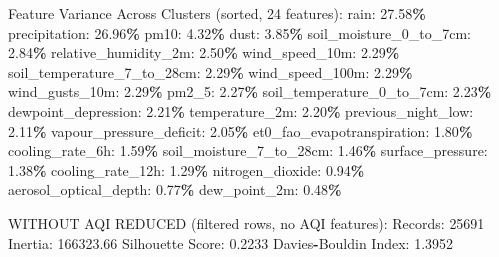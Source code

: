 \documentclass[
  letterpaper,
  DIV=11,
  numbers=noendperiod]{scrartcl}
\newenvironment{Shaded}{\begin{snugshade}}{\end{snugshade}}
\newcommand{\BuiltInTok}[1]{#1}
\newcommand{\DecValTok}[1]{\textcolor[rgb]{0.00,0.00,0.81}{#1}}
\newcommand{\FloatTok}[1]{\textcolor[rgb]{0.00,0.00,0.81}{#1}}
\newcommand{\NormalTok}[1]{#1}
\newcommand{\OperatorTok}[1]{\textcolor[rgb]{0.81,0.36,0.00}{\textbf{#1}}}
\begin{document}
\begin{Shaded}
\begin{Highlighting}[]
\NormalTok{  Feature Variance Across Clusters (}\BuiltInTok{sorted}\NormalTok{, }\DecValTok{24}\NormalTok{ features):}
\NormalTok{    rain: }\FloatTok{27.58}\OperatorTok{\%}
\NormalTok{    precipitation: }\FloatTok{26.96}\OperatorTok{\%}
\NormalTok{    pm10: }\FloatTok{4.32}\OperatorTok{\%}
\NormalTok{    dust: }\FloatTok{3.85}\OperatorTok{\%}
\NormalTok{    soil\_moisture\_0\_to\_7cm: }\FloatTok{2.84}\OperatorTok{\%}
\NormalTok{    relative\_humidity\_2m: }\FloatTok{2.50}\OperatorTok{\%}
\NormalTok{    wind\_speed\_10m: }\FloatTok{2.29}\OperatorTok{\%}
\NormalTok{    soil\_temperature\_7\_to\_28cm: }\FloatTok{2.29}\OperatorTok{\%}
\NormalTok{    wind\_speed\_100m: }\FloatTok{2.29}\OperatorTok{\%}
\NormalTok{    wind\_gusts\_10m: }\FloatTok{2.29}\OperatorTok{\%}
\NormalTok{    pm2\_5: }\FloatTok{2.27}\OperatorTok{\%}
\NormalTok{    soil\_temperature\_0\_to\_7cm: }\FloatTok{2.23}\OperatorTok{\%}
\NormalTok{    dewpoint\_depression: }\FloatTok{2.21}\OperatorTok{\%}
\NormalTok{    temperature\_2m: }\FloatTok{2.20}\OperatorTok{\%}
\NormalTok{    previous\_night\_low: }\FloatTok{2.11}\OperatorTok{\%}
\NormalTok{    vapour\_pressure\_deficit: }\FloatTok{2.05}\OperatorTok{\%}
\NormalTok{    et0\_fao\_evapotranspiration: }\FloatTok{1.80}\OperatorTok{\%}
\NormalTok{    cooling\_rate\_6h: }\FloatTok{1.59}\OperatorTok{\%}
\NormalTok{    soil\_moisture\_7\_to\_28cm: }\FloatTok{1.46}\OperatorTok{\%}
\NormalTok{    surface\_pressure: }\FloatTok{1.38}\OperatorTok{\%}
\NormalTok{    cooling\_rate\_12h: }\FloatTok{1.29}\OperatorTok{\%}
\NormalTok{    nitrogen\_dioxide: }\FloatTok{0.94}\OperatorTok{\%}
\NormalTok{    aerosol\_optical\_depth: }\FloatTok{0.77}\OperatorTok{\%}
\NormalTok{    dew\_point\_2m: }\FloatTok{0.48}\OperatorTok{\%}

\NormalTok{WITHOUT AQI REDUCED (filtered rows, no AQI features):}
\NormalTok{  Records: }\DecValTok{25691}
\NormalTok{  Inertia: }\FloatTok{166323.66}
\NormalTok{  Silhouette Score: }\FloatTok{0.2233}
\NormalTok{  Davies}\OperatorTok{{-}}\NormalTok{Bouldin Index: }\FloatTok{1.3952}


\end{Highlighting}
\end{Shaded}
\end{document}
